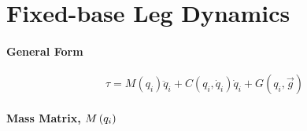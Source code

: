 \chapter{Fixed-base Leg Dynamics}
\label{appendix::b}
	\vspace{-5mm}


	\subsubsection{General Form}	
	\begin{equation*}
		\tau = M(q_{i})\ddot{q}_{i} + C(q_{i},\dot{q}_{i})\dot{q}_{i} + G(q_{i},\vec{g})
	\end{equation*}


	\subsubsection{Mass Matrix, $M\left(q_{i}\right)$}	
